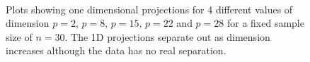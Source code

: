 \begin{figure}[htbp]
\centering
\mbox{\quad
{}\quad
{}\quad
{}\quad
{}}
\caption{Plots showing one dimensional projections for 4 different values of dimension $p=2$, $p=8$, $p = 15$, $p=22$ and $p=28$ for a fixed sample size of $n = 30$. The 1D projections separate out as dimension increases although the data has no real separation.  } 
\label{dist_1d}
\end{figure}

